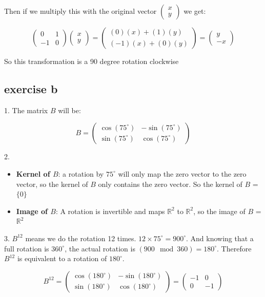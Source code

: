 \documentclass[11pt, a4paper]{article}
\begin{document}
Then if we multiply this with the original vector $\begin{pmatrix}
	x \\
	y
\end{pmatrix}$ we get:

\[
\begin{pmatrix}
	0 & 1 \\
	-1 & 0
\end{pmatrix} \begin{pmatrix}
	x \\
	y
\end{pmatrix} = \begin{pmatrix}
	(0)(x) + (1)(y) \\
	(-1)(x) + (0)(y)
\end{pmatrix} = \begin{pmatrix}
	y \\
	-x
\end{pmatrix}
\]

So this transformation is a 90 degree rotation clockwise


\subsection*{exercise b}

1. The matrix $B$ will be:

\[
B = \begin{pmatrix}
	\cos(75^\circ) & -\sin(75^\circ) \\
	\sin(75^\circ) & \cos(75^\circ)
\end{pmatrix}
\]

2. 
\begin{itemize}
	\item \textbf{Kernel of $B$}: a rotation by $75^\circ$ will only map the zero vector to the zero vector, so the kernel of $B$ only contains the zero vector. So the kernel of $B$ = $\{ {0} \}$ 
	\item \textbf{Image of $B$}: A rotation is invertible and maps ${\mathbb{R}}^2$ to ${\mathbb{R}}^2$, so the image of {$B$} = ${\mathbb{R}}^2$
\end{itemize}


3. ${B}^{12}$ means we do the rotation 12 times. $12 \times 75^\circ = 900^\circ$. And knowing that a full rotation is $360^\circ$, the actual rotation is $(900 \mod 360) = 180^\circ$. Therefore ${B}^{12}$ is equivalent to a rotation of $180^\circ$.

\[
{B}^{12} = \begin{pmatrix}
	\cos(180^\circ) & -\sin(180^\circ) \\
	\sin(180^\circ) & \cos(180^\circ)
\end{pmatrix} = \begin{pmatrix}
	-1 & 0 \\
	0 & -1
\end{pmatrix}
\]
\end{document}
